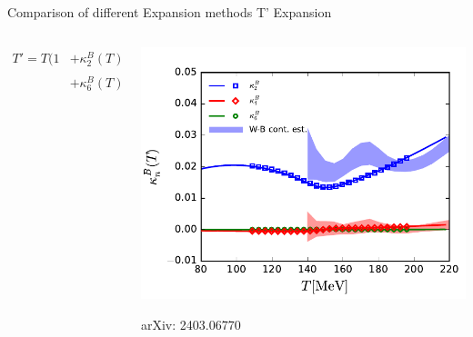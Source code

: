 \begin{frame}[fragile]{Comparison of different Expansion methods}
    \centering
    T' Expansion\\
    \vspace{-0.1cm}
    \begin{columns}
        \begin{column}{0.5\textwidth}
            \begin{align}
              T'=T\bigg( 1&+\kappa^B_2(T)\,\hat{\mu}_B^2+\kappa^B_4(T)\,\hat{\mu}_B^4\nonumber\\[2ex]
              &+\kappa^B_6(T)\,\hat{\mu}_B^6+\cdots \bigg)
            \end{align}
        \end{column}
        \begin{column}{0.5\textwidth}
            \includegraphics[width=1.\linewidth]{Images/Figures/kappa.pdf}
           {\centering \scriptsize arXiv: 2403.06770 \par}
        \end{column}
    \end{columns}
\end{frame}

